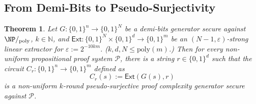 \documentclass[10pt,a4paper]{article}
\newtheorem{theorem}{Theorem}[section]
\theoremstyle{definition}
\theoremstyle{remark}
\renewcommand{\poly}{\mathrm{poly}}
\newcommand{\eps}{\varepsilon}
\newcommand{\Ext}{\mathsf{Ext}}
\newcommand{\calP}{\mathcal{P}}
\newcommand{\N}{\mathbb{N}}
\begin{document}
\ThmPVvsAPC*



\subsection{From Demi-Bits to Pseudo-Surjectivity}\label{sec: pseudosurjectivity}


\begin{theorem}\label{thm:pseudo-pcg-fix}
    Let $G:\{0,1\}^n\to\{0,1\}^N$ be a demi-bits generator secure against $\NP/_{\poly}$, $k\in\N$, and $\Ext:\{0,1\}^N\times\{0,1\}^d\to\{0,1\}^m$ be an $(N-1,\eps)$-strong linear extractor for $\eps:=2^{-10km}$. ($k,d,N\leq\poly(m)$.) Then for every non-uniform propositional proof system $\calP$, there is a string $r\in\{0,1\}^d$ such that the circuit $C_r: \{0,1\}^n\to \{0,1\}^m$ defined as
    \[C_r(s) := \Ext(G(s), r)\]
    is a non-uniform $k$-round pseudo-surjective proof complexity generator secure against $\calP$.
\end{theorem}
\end{document}

